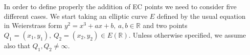 \begin{center}
	\noindent
	\label{fig:figure2}
\end{center}
\noindent
In order to define properly the addition of EC points we need to consider five different cases. We start taking an elliptic curve $E$ defined by the usual equation in Weierstrass form $y^2 = x^3 + ax + b, \ a,b \in \mathbb{R}$ and two points $Q_1 = (x_1, y_1), \ Q_2 = (x_2, y_2) \in E(\mathbb{R})$. Unless otherwise specified, we assume also that $Q_1, Q_2 \neq \infty$.
